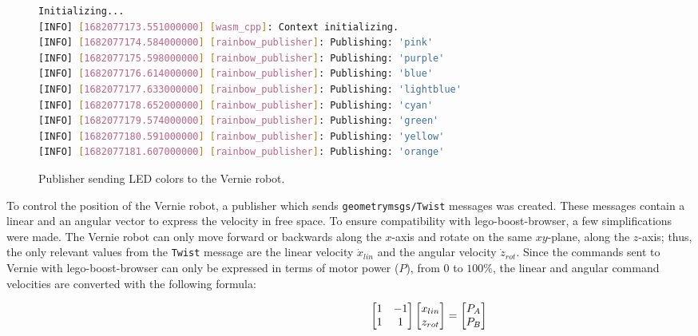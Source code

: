 \begin{figure}[htbp]
            \begin{lstlisting}[language=Bash]
Initializing...
[INFO] [1682077173.551000000] [wasm_cpp]: Context initializing.
[INFO] [1682077174.584000000] [rainbow_publisher]: Publishing: 'pink'
[INFO] [1682077175.598000000] [rainbow_publisher]: Publishing: 'purple'
[INFO] [1682077176.614000000] [rainbow_publisher]: Publishing: 'blue'
[INFO] [1682077177.633000000] [rainbow_publisher]: Publishing: 'lightblue'
[INFO] [1682077178.652000000] [rainbow_publisher]: Publishing: 'cyan'
[INFO] [1682077179.574000000] [rainbow_publisher]: Publishing: 'green'
[INFO] [1682077180.591000000] [rainbow_publisher]: Publishing: 'yellow'
[INFO] [1682077181.607000000] [rainbow_publisher]: Publishing: 'orange'
\end{lstlisting}
            \caption{Publisher sending \ac{LED} colors to the Vernie robot.}
            \label{fig:rainbow}
        \end{figure}


        To control the position of the Vernie robot, a publisher which sends \texttt{geometry\smallunderscore msgs/Twist} messages was created. These messages contain a linear and an angular vector to express the velocity in free space. To ensure compatibility with \textsf{lego-boost-browser}, a few simplifications were made. The Vernie robot can only move forward or backwards along the $x$-axis and rotate on the same $xy$-plane, along the $z$-axis; thus, the only relevant values from the \texttt{Twist} message are the linear velocity $\dot{x}_{lin}$ and the angular velocity $\dot{z}_{rot}$. Since the commands sent to Vernie with \textsf{lego-boost-browser} can only be expressed in terms of motor power ($P$), from 0 to $100\%$, the linear and angular command velocities are converted with the following formula:
        
        \begin{equation}
            \hskip 5cm
            \begin{bmatrix}
                1 & -1 \\
                1 & 1
            \end{bmatrix}
            \begin{bmatrix}
                x_{lin} \\
                z_{rot}
            \end{bmatrix}
            =
            \begin{bmatrix}
                P_A \\
                P_B
            \end{bmatrix}
        \end{equation}

